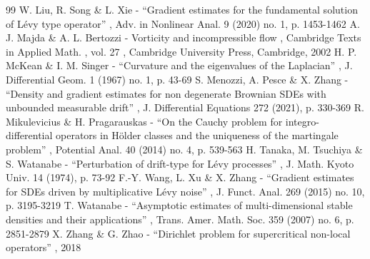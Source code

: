 \begin{thebibliography}{99}
 W. Liu, R. Song \& L. Xie - “Gradient estimates for the fundamental solution of Lévy type operator” , Adv. in Nonlinear Anal. 9 (2020) no. 1, p. 1453-1462
 A. J. Majda \& A. L. Bertozzi - Vorticity and incompressible flow , Cambridge Texts in Applied Math. , vol. 27 , Cambridge University Press, Cambridge, 2002
 H. P. McKean \& I. M. Singer - “Curvature and the eigenvalues of the Laplacian” , J. Differential Geom. 1 (1967) no. 1, p. 43-69
 S. Menozzi, A. Pesce \& X. Zhang - “Density and gradient estimates for non degenerate Brownian SDEs with unbounded measurable drift” , J. Differential Equations 272 (2021), p. 330-369
 R. Mikulevicius \& H. Pragarauskas - “On the Cauchy problem for integro-differential operators in Hölder classes and the uniqueness of the martingale problem” , Potential Anal. 40 (2014) no. 4, p. 539-563
 H. Tanaka, M. Tsuchiya \& S. Watanabe - “Perturbation of drift-type for Lévy processes” , J. Math. Kyoto Univ. 14 (1974), p. 73-92
 F.-Y. Wang, L. Xu \& X. Zhang - “Gradient estimates for SDEs driven by multiplicative Lévy noise” , J. Funct. Anal. 269 (2015) no. 10, p. 3195-3219
 T. Watanabe - “Asymptotic estimates of multi-dimensional stable densities and their applications” , Trans. Amer. Math. Soc. 359 (2007) no. 6, p. 2851-2879
 X. Zhang \& G. Zhao - “Dirichlet problem for supercritical non-local operators” , 2018
\end{thebibliography}
